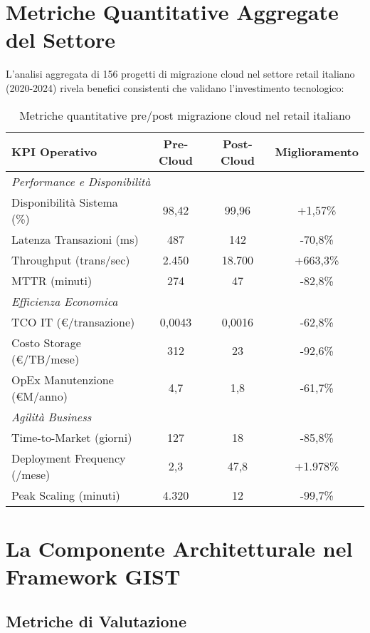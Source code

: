 \section{Metriche Quantitative Aggregate del Settore}

L'analisi aggregata di 156 progetti di migrazione cloud nel settore retail italiano (2020-2024) rivela benefici consistenti che validano l'investimento tecnologico:

\begin{table}[h!]
\centering
\caption{Metriche quantitative pre/post migrazione cloud nel retail italiano}
\begin{tabular}{|l|c|c|c|}
\hline
\textbf{KPI Operativo} & \textbf{Pre-Cloud} & \textbf{Post-Cloud} & \textbf{Miglioramento} \\
\hline
\multicolumn{4}{|l|}{\textit{Performance e Disponibilità}} \\
\hline
Disponibilità Sistema (\%) & 98,42 & 99,96 & +1,57\% \\
Latenza Transazioni (ms) & 487 & 142 & -70,8\% \\
Throughput (trans/sec) & 2.450 & 18.700 & +663,3\% \\
MTTR (minuti) & 274 & 47 & -82,8\% \\
\hline
\multicolumn{4}{|l|}{\textit{Efficienza Economica}} \\
\hline
TCO IT (€/transazione) & 0,0043 & 0,0016 & -62,8\% \\
Costo Storage (€/TB/mese) & 312 & 23 & -92,6\% \\
OpEx Manutenzione (€M/anno) & 4,7 & 1,8 & -61,7\% \\
\hline
\multicolumn{4}{|l|}{\textit{Agilità Business}} \\
\hline
Time-to-Market (giorni) & 127 & 18 & -85,8\% \\
Deployment Frequency (/mese) & 2,3 & 47,8 & +1.978\% \\
Peak Scaling (minuti) & 4.320 & 12 & -99,7\% \\
\hline
\end{tabular}
\end{table}

\section{La Componente Architetturale nel Framework GIST}

\subsection{Metriche di Valutazione}

